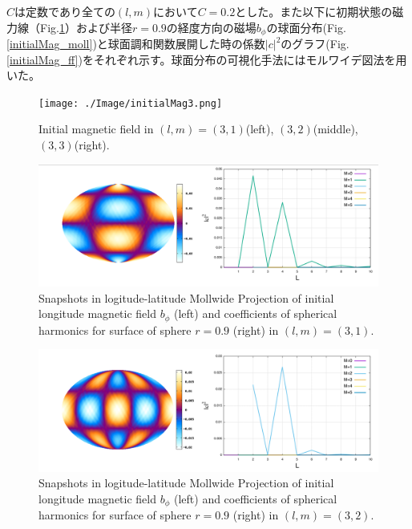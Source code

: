 \documentclass[12pt]{jsarticle}
\begin{document}
$C$は定数であり全ての$(l,m)$において$C=0.2$とした。また以下に初期状態の磁力線（Fig.\ref{initialMag1}）および半径$r=0.9$の経度方向の磁場$b_\phi$の球面分布(Fig.\ref{initialMag_moll})と球面調和関数展開した時の係数$|c|^2$のグラフ(Fig.\ref{initialMag_ff})をそれぞれ示す。球面分布の可視化手法にはモルワイデ図法を用いた。
\begin{figure}[H]
\centering
\texttt{[image: ./Image/initialMag3.png]}
\caption{Initial magnetic field in $(l,m)=(3,1)$(left), $(3,2)$(middle), $(3,3)$(right).  } \label{initialMag1}
\end{figure}

\begin{figure}[H]
\centering
\includegraphics[height=1.0\textheight,width=1.0\hsize,angle=0,keepaspectratio]{./Image/b0p_L3M1.png}
\caption{Snapshots in logitude-latitude Mollwide Projection of initial longitude magnetic field $b_\phi$ (left) and coefficients of spherical harmonics for surface of sphere $r=0.9$ (right) in $(l,m)=(3,1)$.  } \label{b0p_L3M1}
\end{figure}

\begin{figure}[H]
\centering
\includegraphics[height=1.0\textheight,width=1.0\hsize,angle=0,keepaspectratio]{./Image/b0p_L3M2.png}
\caption{Snapshots in logitude-latitude Mollwide Projection of initial longitude magnetic field $b_\phi$ (left) and coefficients of spherical harmonics for surface of sphere $r=0.9$ (right) in $(l,m)=(3,2)$.  } \label{b0p_L3M2}
\end{figure}
\end{document}
